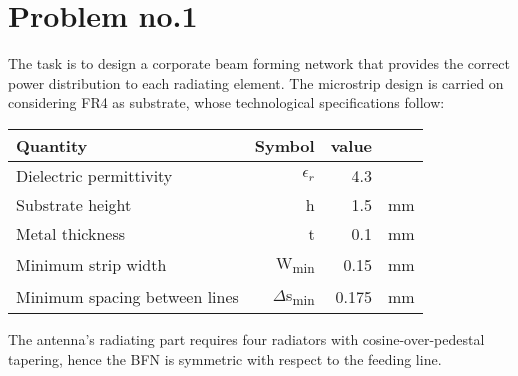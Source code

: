 \section{Problem no.1}

The task is to design a corporate beam forming network that provides the correct power distribution to each radiating element. The microstrip design is carried on considering FR4 as substrate, whose technological specifications follow:

 \begin{table} [h]
 	\label{tab:p1_FR4}
 	\centering	
 	\begin{tabular}{lrrr} 
 		\toprule 
 		Quantity & Symbol & value & \\
 		\midrule
		Dielectric permittivity &$\epsilon_{r}$		&4.3		& 		\\
 		Substrate height&	h				& 1.5		&  mm	\\ 
 		Metal thickness&t	& 0.1	& mm\\
 		Minimum strip width &W\textsubscript{min}&0.15 & mm \\
 		Minimum spacing between lines &$\Delta$s\textsubscript{min}&0.175 & mm \\
 		\bottomrule 
 	\end{tabular}	
 \end{table}

The antenna's radiating part requires four radiators with cosine-over-pedestal tapering, hence the BFN is symmetric with respect to the feeding line. %

